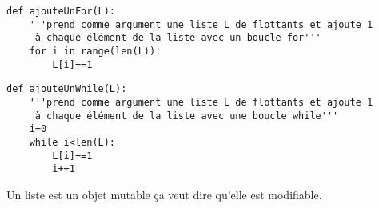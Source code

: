 \exer{}
\setcounter{numques}{0}


\begin{lstlisting}
def ajouteUnFor(L):
    '''prend comme argument une liste L de flottants et ajoute 1
     à chaque élément de la liste avec un boucle for'''
    for i in range(len(L)):
        L[i]+=1
\end{lstlisting}


\begin{lstlisting}
def ajouteUnWhile(L):
    '''prend comme argument une liste L de flottants et ajoute 1
     à chaque élément de la liste avec une boucle while'''
    i=0
    while i<len(L):
        L[i]+=1
        i+=1
 \end{lstlisting}


Un liste est un objet mutable ça veut dire qu'elle est modifiable.